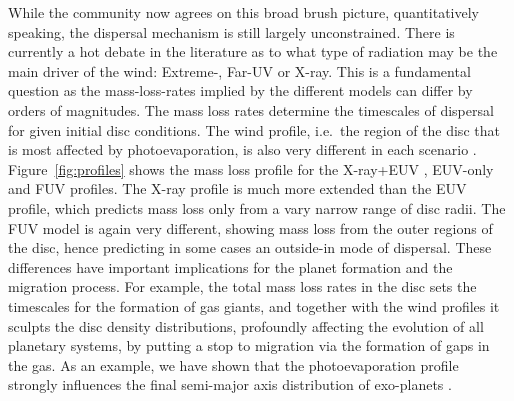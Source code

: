 \documentclass[10pt,fleqn,twoside]{article}
\begin{document}
While the community now agrees on this broad brush picture,
quantitatively speaking, the dispersal mechanism is still largely
unconstrained. There is currently a hot debate in the literature as to
what type of radiation may be the main driver of the wind: Extreme-,
Far-UV or X-ray. This is a fundamental question as the mass-loss-rates
implied by the different models can differ by orders of
magnitudes. The mass loss rates determine the timescales of dispersal for
given initial disc conditions. The wind profile, i.e.\ the region of
the disc that is most affected by photoevaporation, is also very
different in each scenario 
\citep[e.g.][]{2014prpl.conf..475A, 2011ARA&A..49..195A}.
Figure~\ref{fig:profiles} shows the mass loss profile for the X-ray+EUV
\citep{2010MNRAS.401.1415O},
EUV-only 
\citep{2004ApJ...607..890F}
and FUV
\citep{2009ApJ...705.1237G}
profiles. The X-ray profile is much
more extended than the EUV profile, which predicts mass loss only from
a vary narrow range of disc radii. The FUV model is again very
different, showing mass loss from the outer regions of the disc, hence
predicting in some cases an outside-in mode of dispersal. These
differences have important implications for the planet formation and
the migration 
process. For example, the total
mass loss rates in the disc sets the timescales for the formation of
gas giants, and together with the wind
profiles it sculpts the disc density distributions, profoundly affecting
the evolution of all planetary systems, by putting a stop to migration via
the formation of gaps in the gas. As an example, we have shown that
the photoevaporation profile strongly influences the final semi-major
axis distribution of exo-planets 
\citep{2015MNRAS.450.3008E}.
\end{document}
